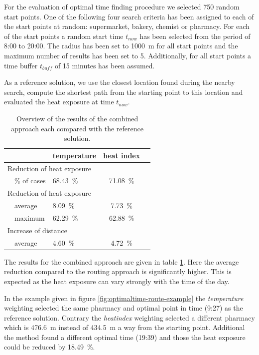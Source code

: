 For the evaluation of optimal time finding procedure we selected 750 random start points. One of the following four search criteria has been assigned to each of the start points at random: supermarket, bakery, chemist or pharmacy. For each of the start points a random start time $t_{now}$ has been selected from the period of 8:00 to 20:00. The radius has been set to \SI{1000}{\meter} for all start points and the maximum number of results has been set to 5. Additionally, for all start points a time buffer $t_{buff}$ of 15 minutes has been assumed. 

As a reference solution, we use the closest location found during the nearby search, compute the shortest path from the starting point to this location and evaluated the heat exposure at time $t_{now}$. 

\begin{table}
	\centering
	\begin{tabular}{lp{9.25cm}lcc}
		\hline
		& & temperature & heat index \\
		\hline
		\multicolumn{4}{l}{Reduction of heat exposure}   \\
		& \% of cases  & \SI{68.43}{\percent} & \SI{71.08}{\percent}  \\
		\multicolumn{4}{l}{Reduction of heat exposure}  \\
		& average  & \SI{8.09}{\percent} & \SI{7.73}{\percent}  \\
		& maximum  & \SI{62.29}{\percent} & \SI{62.88}{\percent}  \\
		\multicolumn{4}{l}{Increase of distance}  \\
		& average  & \SI{4.60}{\percent}  & \SI{4.72}{\percent}  \\
		\hline
	\end{tabular}
	\caption{Overview of the results of the combined approach each compared with the reference solution.  \label{tab:results-optimal-time}}
\end{table}


The results for the combined approach are given in table \ref{tab:results-optimal-time}. Here the average reduction compared to the routing approach is significantly higher. This is expected as the heat exposure can vary strongly with the time of the day. 

In the example given in figure \ref{fig:optimaltime-route-example} the \emph{temperature} weighting selected the same pharmacy and optimal point in time (9:27) as the reference solution. Contrary the \emph{heatindex} weighting selected a different pharmacy which is \SI{476.6}{\meter} instead of  \SI{434.5}{\meter} a way from the starting point. Additional the method found a different optimal time (19:39) and those the heat exposure could be reduced by \SI{18.49}{\percent}.  
 
